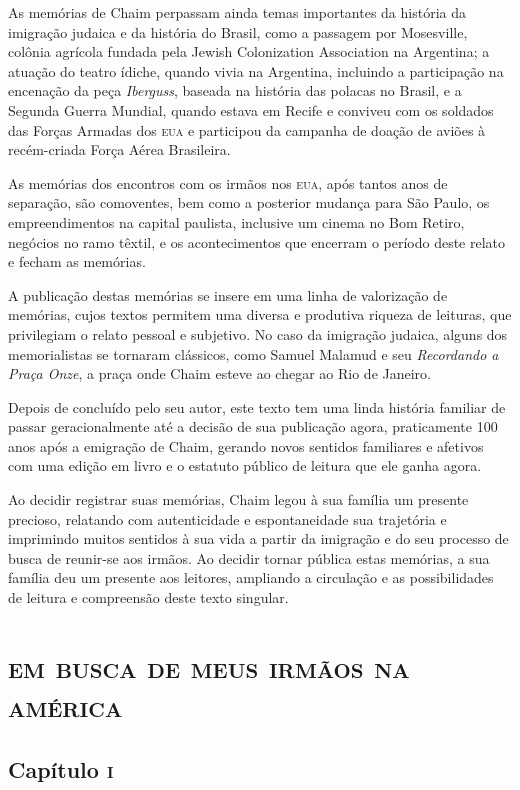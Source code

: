 As memórias de Chaim perpassam ainda temas importantes da história da
imigração judaica e da história do Brasil, como a passagem por
Mosesville, colônia agrícola fundada pela Jewish Colonization
Association na Argentina; a atuação do teatro ídiche, quando vivia na
Argentina, incluindo a participação na encenação da peça \textit{Iberguss},
baseada na história das polacas no Brasil, e a Segunda Guerra Mundial,
quando estava em Recife e conviveu com os soldados das Forças Armadas
dos \textsc{eua} e participou da campanha de doação de aviões à recém-criada
Força Aérea Brasileira.

As memórias dos encontros com os irmãos nos \textsc{eua}, após tantos anos de
separação, são comoventes, bem como a posterior mudança para São Paulo,
os empreendimentos na capital paulista, inclusive um cinema no Bom
Retiro, negócios no ramo têxtil, e os acontecimentos que encerram o
período deste relato e fecham as memórias.

A publicação destas memórias se insere em uma linha de valorização de
memórias, cujos textos permitem uma diversa e produtiva riqueza de
leituras, que privilegiam o relato pessoal e subjetivo. No caso da
imigração judaica, alguns dos memorialistas se tornaram clássicos, como
Samuel Malamud e seu \textit{Recordando a Praça Onze}, a praça onde Chaim esteve ao chegar
ao Rio de Janeiro.

Depois de concluído pelo seu autor, este texto tem uma linda história
familiar de passar geracionalmente até a decisão de sua publicação
agora, praticamente 100 anos após a emigração de Chaim, gerando novos
sentidos familiares e afetivos com uma edição em livro e o estatuto
público de leitura que ele ganha agora.

Ao decidir registrar suas memórias, Chaim legou à sua família um
presente precioso, relatando com autenticidade e espontaneidade sua
trajetória e imprimindo muitos sentidos à sua vida a partir da imigração
e do seu processo de busca de reunir-se aos irmãos. Ao decidir tornar
pública estas memórias, a sua família deu um presente aos leitores,
ampliando a circulação e as possibilidades de leitura e compreensão
deste texto singular.

\part[Em busca de meus irmãos na América]{\textsc{em busca de meus irmãos na américa}}

\chapter{Capítulo \textsc{i}}

